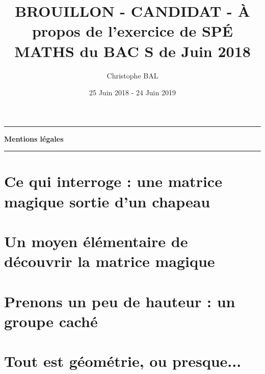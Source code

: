 \documentclass[12pt]{amsart}
\newcommand\squote[1]{\og #1 \fg{}}
\begin{document}
\title{BROUILLON - CANDIDAT - À propos de l'exercice de SPÉ MATHS du BAC S de Juin 2018}
\author{Christophe BAL}
\date{25 Juin 2018 - 24 Juin 2019}
\maketitle


\begin{center}
	\hrule\vspace{.3em}
	{
		\fontsize{1.35em}{1em}\selectfont
		\textbf{Mentions \og légales \fg}
	}
			
	\vspace{0.45em}
	\doclicenseThis
	\hrule
\end{center}



\setcounter{tocdepth}{2}
\tableofcontents



\section{Ce qui interroge : une matrice \squote{magique} sortie d'un chapeau}





\section{Un moyen élémentaire de découvrir la matrice \squote{magique}}





\section{Prenons un peu de hauteur : un groupe \squote{caché}}





\section{Tout est géométrie, ou presque...}


\end{document}
